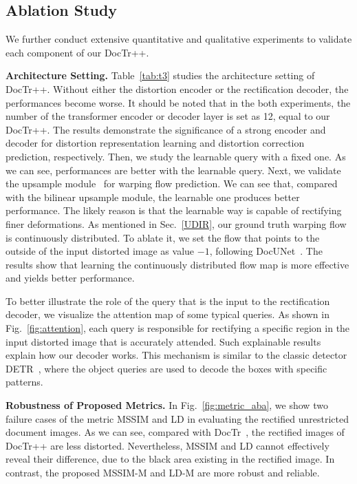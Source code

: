 \documentclass[lettersize,journal]{IEEEtran}
\begin{document}
\subsection{Ablation Study}
We further conduct extensive quantitative and qualitative experiments to validate each component of our DocTr++.

\smallskip
\textbf{Architecture Setting.}
Table~\ref{tab:t3} studies the architecture setting of DocTr++.
Without either the distortion encoder or the rectification decoder,
the performances become worse.
It should be noted that in the both experiments, the number of the transformer encoder or decoder layer is set as 12, equal to our DocTr++.
The results demonstrate the significance of a strong encoder and decoder for distortion representation learning and distortion correction prediction, respectively.
Then,
we study the learnable query with a fixed one.
As we can see,
performances are better with the learnable query.
Next,
we validate the upsample module~\cite{feng2021doctr} for warping flow prediction.
We can see that, compared with the bilinear upsample module, the learnable one produces better performance.
The likely reason is that the learnable way is capable of rectifying finer deformations.
As mentioned in Sec.~\ref{UDIR}, our ground truth warping flow is continuously distributed.
To ablate it, we set the flow that points to the outside of the input distorted image as value $-1$, following DocUNet~\cite{8578592}.
The results show that learning the continuously distributed flow map is more effective and yields better performance.


To better illustrate the role of the query that is the input to the rectification decoder, we visualize the attention map of some typical queries.
As shown in Fig.~\ref{fig:attention},
each query is responsible for rectifying a specific region in the input distorted image that is accurately attended.
Such explainable results explain how our decoder works.
This mechanism is similar to the classic detector DETR~\cite{carion2020end},
where the object queries are used to decode the boxes with specific patterns. 

\smallskip
\textbf{Robustness of Proposed Metrics.}
In Fig.~\ref{fig:metric_aba},
we show two failure cases of the metric MSSIM and LD in evaluating the rectified unrestricted document images.
As we can see, compared with DocTr~\cite{feng2021doctr}, 
the rectified images of DocTr++ are less distorted. 
Nevertheless,
MSSIM and LD cannot effectively reveal their difference,
due to the black area existing in the rectified image.
In contrast, 
the proposed MSSIM-M and LD-M are more robust and reliable.
\end{document}
